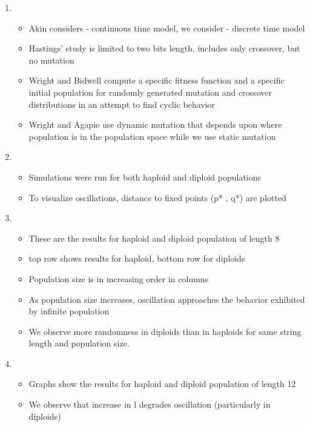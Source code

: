 \documentclass{article}
\begin{document}
\begin{enumerate}
    
\item
  \begin{itemize}
  \item Akin considers - continuous time model, we consider -
    discrete time model
   \item Hastings' study is limited to two bits length, includes only
     crossover, but no mutation
  \item Wright and Bidwell compute a specific fitness function and a
    specific initial population for randomly generated mutation and
    crossover distributions in an attempt to find cyclic behavior
  \item Wright and Agapie use dynamic mutation that depends upon
    where population is in the population space while we use static
    mutation
  \end{itemize}

\item
  \begin{itemize}
  \item Simulations were run for both haploid and diploid populations
  \item To visualize oscillations, distance to fixed points (p* , q*) are plotted
  \end{itemize}
    
\item
  \begin{itemize}
  \item These are the results for haploid and diploid population of
    length 8
   \item top row shows results for haploid, bottom row for diploids
  \item Population size is in increasing order in columns
  \item As population size increases, oscillation approaches the
    behavior exhibited by infinite population
  \item We observe more randomness in diploids than in haploids for
    same string length and population size.
  \end{itemize}
    
\item
  \begin{itemize}
  \item Graphs show the results for haploid and diploid population of
    length 12
   \item We observe that increase in l degrades oscillation (particularly in diploids)
  \end{itemize}
    

\end{enumerate}
\end{document}
